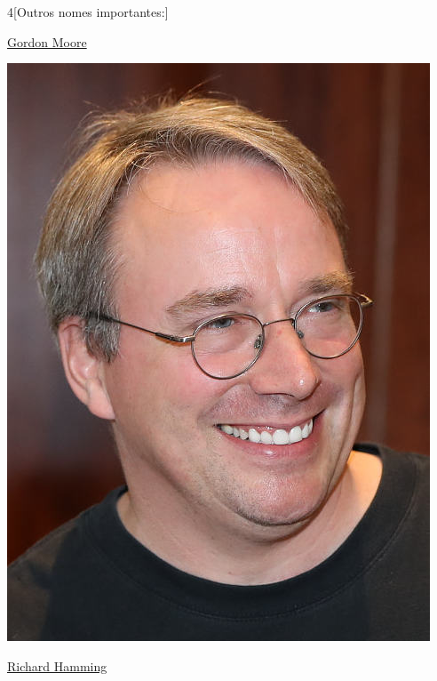 \begin{multicols}{4}[Outros nomes importantes:]
\vfill\null
\columnbreak				
				
				\href{https://pt.wikipedia.org/wiki/Gordon_Moore}{Gordon Moore}
				
\begin{center}
					\includegraphics[width=.8\columnwidth]{./IMG-GIT/CIENTISTAS/linus.jpeg}
\end{center}
				
\vfill\null
\columnbreak				
				
				\href{https://pt.wikipedia.org/wiki/Richard_Hamming}{Richard Hamming}
				

\end{multicols}
